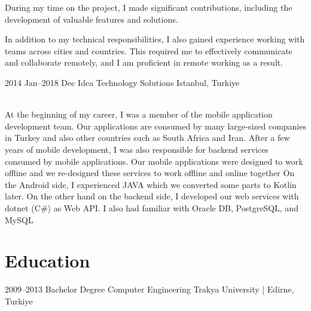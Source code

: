 \documentclass[]{cv-style}
\begin{document}
\begin{entrylist}
{		During my time on the project, I made significant contributions, including the development of valuable features and solutions.

		In addition to my technical responsibilities, I also gained experience working with teams across cities and countries. This required me to effectively communicate and collaborate remotely, and I am proficient in remote working as a result.
		}
		\entry
		{2014 Jan--2018 Dec}
		{Idea Technology Solutions}
		{Istanbul, Turkiye}
		{\\
		At the beginning of my career, I was a member of the mobile application development team. Our applications are consumed by many large-sized companies in Turkey and also other countries such as South Africa and Iran.
		After a few years of mobile development, I was also responsible for backend services consumed by mobile applications. Our mobile applications were designed to work offline and we re-designed these services to work offline and online together
		On the Android side, I experienced JAVA which we converted some parts to Kotlin later. On the other hand on the backend side, I developed our web services with dotnet (C\#) as Web API. I also had familiar with Oracle DB, PostgreSQL, and MySQL

		}

	\end{entrylist}


	\section{Education}

	\begin{entrylist}
		\entry
		{2009--2013}
		{Bachelor Degree {\normalfont Computer Engineering}}
		{Trakya University  |  Edirne, Turkiye}
		{\vspace{-0.3cm}}
	\end{entrylist}

\end{document}
